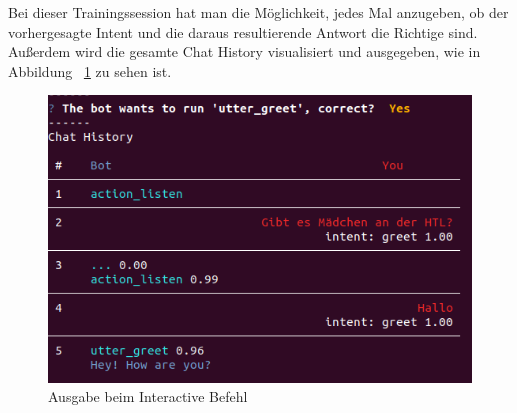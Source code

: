 Bei dieser Trainingssession hat man die Möglichkeit, jedes Mal anzugeben, ob der vorhergesagte Intent und die daraus resultierende Antwort die Richtige sind.
Außerdem wird die gesamte Chat History visualisiert und ausgegeben, wie in Abbildung ~\ref{fig:rasa_interactive} zu sehen ist.

\begin{figure}[hbt!]
    \centering
    \includegraphics[scale=0.80]{pics/rasa_interactive}
    \caption{Ausgabe beim Interactive Befehl}
    \label{fig:rasa_interactive}
\end{figure}
